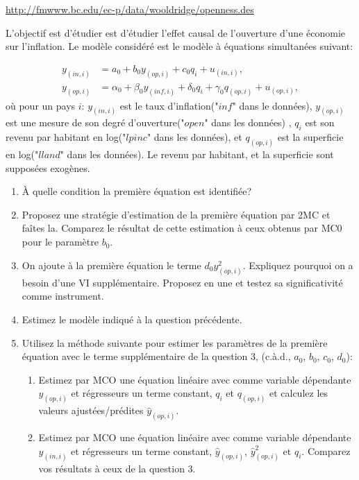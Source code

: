 \medskip

\url{http://fmwww.bc.edu/ec-p/data/wooldridge/openness.des}

\medskip
L'objectif est d'étudier est d'étudier l'effet causal de l'ouverture d'une économie sur l'inflation. 
Le modèle considéré est le modèle à équations simultanées suivant:

\begin{align*}
	y_{(in,i)} &= a_0 + b_0 y_{(op, i)} + c_0 q_i + u_{(in,i)},\\
	y_{(op,i)} &= \alpha_0 + \beta_0 y_{(inf, i)} + \delta_0 q_i  + \gamma_0q_{(op, i)}+ u_{(op,i)},
\end{align*}
où pour un pays $i$: $y_{(in,i)}$ est le taux d'inflation("$inf$" dans le données), 
$y_{(op,i)}$ est une mesure de son degré d'ouverture("$open$" dans les données) , 
$q_i$ est son revenu par habitant en log("$lpinc$" dans les données), et $q_{(op, i)}$ 
est la superficie en log("$lland$" dans les données). Le revenu par habitant, et la superficie sont supposées exogènes.

\begin{enumerate}
\item À quelle condition la première équation est identifiée?
\item Proposez une stratégie d'estimation de la première équation par 2MC et faîtes la.
 Comparez le résultat de cette estimation à ceux obtenus par MC0 pour le paramètre $b_0$.
 \item On ajoute à la première équation le terme $d_0 y_{(op, i)}^2$. Expliquez 
 pourquoi on a besoin d'une VI supplémentaire. Proposez en une et testez sa significativité comme instrument.
 \item Estimez le modèle indiqué à la question précédente.
 \item Utilisez la méthode suivante pour estimer les paramètres de la première équation avec le terme supplémentaire de la question 3, (c.à.d., $a_0$, $b_0$, $c_0$, $d_0$): 
 \begin{enumerate}[label=(\roman*)]
 \item Estimez par MCO une équation linéaire avec comme variable dépendante $y_{(op,i)}$ et régresseurs un terme constant, $q_i$ et $q_{(op, i)}$ et calculez les valeurs ajustées/prédites $\hat{y}_{(op,i)}$.
 \item Estimez par MCO une équation linéaire avec comme variable dépendante $y_{(in,i)}$ et régresseurs un terme constant, $\hat{y}_{(op,i)}$, $\hat{y}_{(op,i)}^2$ et $q_i$. Comparez vos résultats à ceux de la question 3.
 \end{enumerate}
 
 
\end{enumerate}

